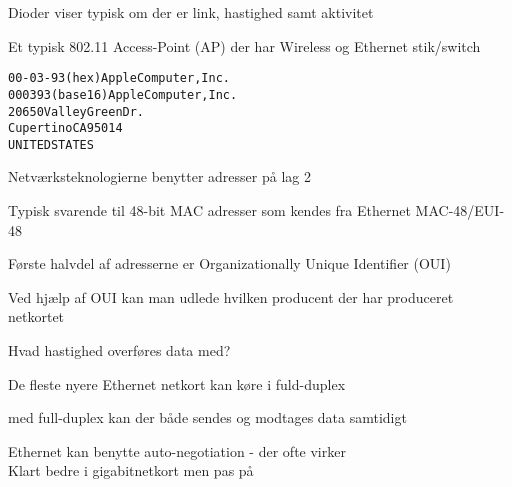 \documentclass[Screen16to9,17pt]{foils}
\begin{document}


\centerline{Dioder viser typisk om der er link, hastighed samt aktivitet}



\begin{list1}
\item Et typisk 802.11 Access-Point (AP) der har Wireless og Ethernet stik/switch
\end{list1}


\begin{alltt}
00-03-93   (hex)        Apple Computer, Inc.
000393     (base 16)    Apple Computer, Inc.
                        20650 Valley Green Dr.
                        Cupertino CA 95014
                        UNITED STATES
\end{alltt}
\begin{list1}
\item Netværksteknologierne benytter adresser på lag 2
\item Typisk svarende til 48-bit MAC adresser som kendes fra Ethernet MAC-48/EUI-48
\item Første halvdel af adresserne er Organizationally Unique Identifier (OUI)
\item Ved hjælp af OUI kan man udlede hvilken producent der har produceret netkortet
\item {}
\end{list1}



\begin{list1}
\item Hvad hastighed overføres data med?
\item De fleste nyere Ethernet netkort kan køre i fuld-duplex
\item med full-duplex kan der både sendes og modtages data samtidigt
\item Ethernet kan benytte auto-negotiation - der ofte virker\\
Klart bedre i gigabitnetkort men pas på
\end{list1}

\end{document}
